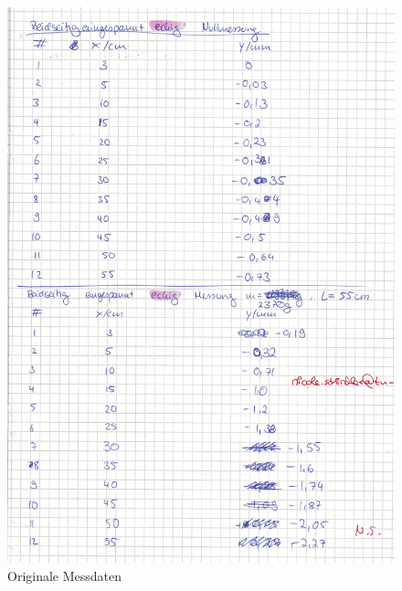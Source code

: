 \begin{figure}
  \centering
  \includegraphics[width=\textwidth]{OMD4.pdf}
  \caption{Originale Messdaten}
  \label{OMD4}
\end{figure}


%



\nocite{*}
\printbibliography



